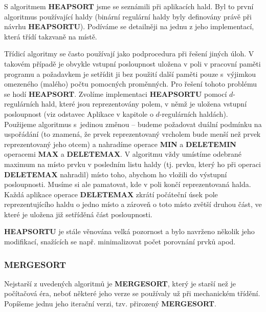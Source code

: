 \documentclass[a4paper,12pt]{article}
\begin{document}
S algoritmem {\bf HEAPSORT} jsme se seznámili při 
aplikacích hald.  Byl to první algoritmus používající haldy 
(binární regulár\-ní haldy byly definovány právě při návrhu 
{\bf HEAP\-SORTU}).  Podíváme se detailněji na jednu z jeho 
implementací, která třídí takzvaně na místě. 

Třídicí algoritmy se často používají jako 
podprocedura při řešení jiných úloh. V takovém případě je 
obvykle vstupní posloupnost uložena v poli v pracovní 
paměti programu a poža\-dav\-kem  je setřídit ji 
bez použití další 
paměti pouze s~výjimkou omezeného (malého) počtu pomocných 
proměnných. Pro řešení tohoto problému se hodí 
{\bf HEAPSORT}. Zvolíme implementaci {\bf HEAPSORTU} pomocí 
$d$-regulárních hald, které jsou reprezentovány  
polem, v němž je uložena vstupní posloupnost (viz odstavec 
Aplikace v kapitole o $d$-regulárních haldách). Použijeme 
algoritmus s~jedinou změnou -- budeme požadovat duální 
podmínku na uspořádání (to znamená, že prvek reprezentovaný 
vrcholem bude menší než prvek reprezentovaný jeho 
otcem) a nahradíme operace {\bf MIN} a {\bf DELETEMIN }
operacemi {\bf MAX} a {\bf DELETEMAX}. V algoritmu vždy umístíme 
odebrané maximum na místo prvku v posled\-ním listu 
haldy (tj. prvku, který ho při operaci {\bf DELETEMAX }
nahradil) místo toho, abychom ho vložili 
do výstupní posloupnosti. Musíme si ale 
pamatovat, kde v poli končí reprezentovaná halda. Každá 
aplikace operace {\bf DELETEMAX} zkrátí počáteční úsek pole 
reprezentujícího haldu o jedno místo 
a zároveň o toto místo zvětší druhou část, ve které je uložena již 
setříděná část posloupnosti. 

{\bf HEAPSORTU} je stále věnována velká pozornost a 
bylo navrže\-no několik jeho modifikací, snažících se 
např. minimalizovat počet porovnání prvků apod.

\subsubsection{MERGESORT}

Nejstarší z uvedených algoritmů je 
{\bf MERGESORT}, který je starší než je počítačová éra, 
neboť některé jeho 
verze se používaly už při mecha\-nickém třídění. Popíšeme 
jednu jeho iterační verzi, tzv. přirozený {\bf MERGESORT}. 
\end{document}
